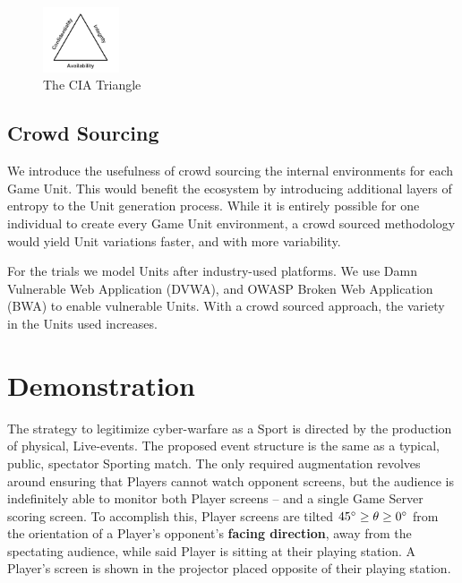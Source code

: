 \documentclass[10pt, titlepage, twocolumn]{article}
\newcommand{\ii}{\indent\indent}
\begin{document}
\begin{figure}[!htb]
	\centering
	\includegraphics[width=0.20\textwidth]{ciatri}
	\caption{The CIA Triangle}
	\label{ciatri}
\end{figure}

\subsection{Crowd Sourcing}
\ii
We introduce the usefulness of crowd sourcing the internal environments for each Game Unit. This would benefit the ecosystem by introducing additional layers of entropy to the Unit generation process. While it is entirely possible for one individual to create every Game Unit environment, a crowd sourced methodology would yield Unit variations faster, and with more variability.

For the trials we model Units after industry-used platforms. We use Damn Vulnerable Web Application (DVWA), and OWASP Broken Web Application (BWA) to enable vulnerable Units. With a crowd sourced approach, the variety in the Units used increases.








\section{Demonstration}

The strategy to legitimize cyber-warfare as a Sport is directed by the production of physical, Live-events. The proposed event structure is the same as a typical, public, spectator Sporting match. The only required augmentation revolves around ensuring that Players cannot watch opponent screens, but the audience is indefinitely able to monitor both Player screens -- and a single Game Server scoring screen. To accomplish this, Player screens are tilted \( 45\degree \ge \theta \ge 0\degree \) from the orientation of a Player's opponent's \textbf{facing direction}, away from the spectating audience, while said Player is sitting at their playing station. A Player's screen is shown in the projector placed opposite of their playing station.

\end{document}
